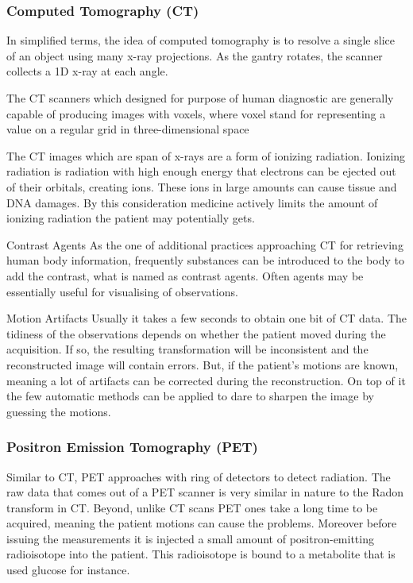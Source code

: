 \subsubsection{Computed Tomography (CT)}
In simplified terms, the idea of computed tomography is to resolve a single slice of an object using many x-ray projections. As the gantry rotates, the scanner collects a 1D x-ray at each angle.

The CT scanners which designed for purpose of human diagnostic are generally capable of producing images with voxels, where voxel stand for representing a value on a regular grid in three-dimensional space    

The CT images which are span of x-rays are a form of ionizing radiation. Ionizing radiation is radiation with high enough energy that electrons can be ejected out of their orbitals, creating ions. These ions in large amounts can cause tissue and DNA damages. By this consideration medicine actively limits the amount of ionizing radiation the patient may potentially gets.

\item Contrast Agents
\newline
As the one of additional practices approaching CT for retrieving human body information, frequently substances can be introduced to the body to add the contrast, what is named as contrast agents. Often agents may be essentially useful for visualising of observations.          

\item Motion Artifacts
\newline
Usually it takes a few seconds to obtain one bit of CT data. The tidiness of the observations depends on whether the patient moved during the acquisition. If so, the resulting transformation will be inconsistent and the reconstructed image will contain errors. But, if the patient's motions are known, meaning a lot of artifacts can be corrected during the reconstruction. On top of it the few automatic methods can be applied to dare to sharpen the image by guessing the motions.

\subsubsection{Positron Emission Tomography (PET)}      
Similar to CT, PET approaches with ring of detectors to detect radiation. The raw data that comes out of a PET scanner is very similar in nature to the Radon transform in CT. Beyond, unlike CT scans PET ones take a long time to be acquired, meaning the patient motions can cause the problems. Moreover before issuing the measurements it is injected a small amount of positron-emitting radioisotope into the patient. This radioisotope is bound to a metabolite that is used glucose for instance.        

